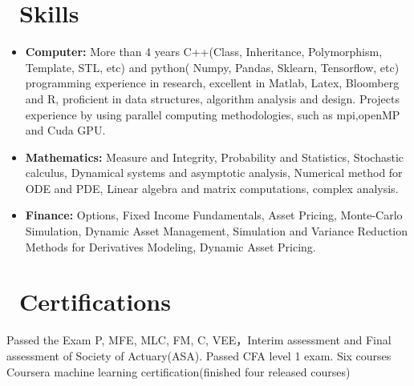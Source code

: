\documentclass{resume}
\begin{document}
\section{\faWrench
\ Skills}
\begin{itemize}[parsep=0.5ex]\large
  \item \textbf{Computer:} More than 4 years C++(Class, Inheritance, Polymorphism, Template, STL, etc) and python( Numpy, Pandas,
  Sklearn, Tensorflow, etc) programming experience in research,  excellent in Matlab, Latex, Bloomberg and R, proficient in data structures, algorithm analysis and design. Projects experience by using parallel computing methodologies, such as mpi,openMP and Cuda GPU.
  
  \item \textbf{Mathematics:}
   Measure and Integrity, Probability and Statistics, Stochastic calculus, Dynamical systems and asymptotic analysis,
  Numerical method for ODE and PDE, Linear algebra and matrix computations, complex analysis.
  
  \item \textbf{Finance:} Options, Fixed Income Fundamentals, Asset Pricing, Monte-Carlo Simulation, Dynamic Asset Management,
  Simulation and Variance Reduction Methods for Derivatives Modeling, Dynamic Asset Pricing.
  
\end{itemize}

\section{\faBook\ Certifications}\large 
Passed the Exam P, MFE, MLC, FM, C, VEE，Interim assessment and Final assessment of Society of Actuary(ASA). Passed CFA level 1 exam. Six courses Coursera machine learning certification(finished four released courses)

%
%
\end{document}
